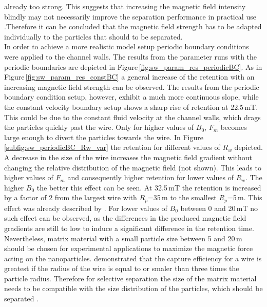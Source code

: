 already too strong. This suggests that increasing the magnetic field intensity blindly may not necessarily improve the separation performance in practical use \cite{ge2017magnetic}.Therefore it can be concluded that the magnetic field strength has to be adapted individually to the particles that should to be separated.\\ \newline
\FloatBarrier
In order to achieve a more realistic model setup periodic boundary conditions were applied to the channel walls. The results from the parameter runs with the periodic boundaries are depicted in Figure\,\ref{fig:sw_param_res_periodicBC}. As in Figure\,\ref{fig:sw_param_res_constBC} a general increase of the retention with an increasing magnetic field strength can be observed. The results from the periodic boundary condition setup, however, exhibit a much more continuous slope, while the constant velocity boundary setup shows a sharp rise of retention at 22.5\,mT. This could be due to the constant fluid velocity at the channel walls, which drags the particles quickly past the wire. Only for higher values of $B_{0}$, $F_{m}$ becomes large enough to divert the particles towards the wire. In Figure \ref{subfig:sw_periodicBC_Rw_var} the retention for different values of $R_{w}$ depicted. A decrease in the size of the wire increases the magnetic field gradient without changing the relative distribution of the magnetic field (not shown). This leads to higher values of $F_{m}$ and consequently higher retention for lower values of $R_{w}$. The higher $B_{0}$ the better this effect can be seen. At 32.5\,mT the retention is increased by a factor of 2 from the largest wire with $R_{p}$=35\,\textmu m to the smallest $R_{p}$=5\,\textmu m. This effect was already described by \cite{aharoni1976traction}. For lower values of $B_{0}$ between 0 and 20\,mT no such effect can be observed, as the differences in the produced magnetic field gradients are still to low to induce a significant difference in the retention time. Nevertheless, matrix material with a small particle size between 5 and 20\,\textmu m should be chosen for experimental applications to maximize the magnetic force acting on the nanoparticles. \cite{oberteuffer1974magnetic} demonstrated that the capture efficiency for a wire is greatest if the radius of the wire is equal to or smaler than three times the particle radius. Therefore for selective separation the size of the matrix material needs to be compatible with the size distribution of the particles, which should be separated \cite{ge2017magnetic}. \newline

